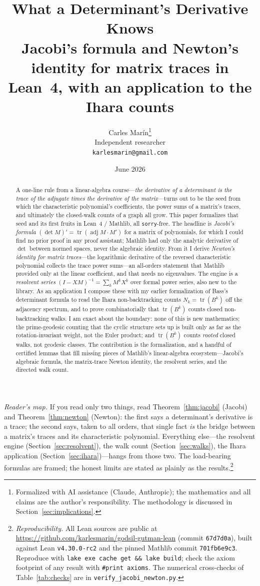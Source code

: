 \documentclass[11pt]{article}
\title{\bf What a Determinant's Derivative Knows\\[4pt]
  \large\normalfont Jacobi's formula and Newton's identity for matrix traces in Lean~4,
  with an application to the Ihara counts}
\author{Carles Mar\'in\thanks{Formalized with AI assistance (Claude, Anthropic); the mathematics
and all claims are the author's responsibility. The methodology is discussed in
Section~\ref{sec:implications}.}\\[3pt]
  \normalsize Independent researcher\\
  \normalsize \texttt{karlesmarin@gmail.com}}
\date{June 2026}
\newcommand{\lean}[1]{{\def\_{\textunderscore\allowbreak}\texttt{#1}}}
\newcommand{\tr}{\operatorname{tr}}
\newcommand{\adj}{\operatorname{adj}}
\begin{document}
\maketitle

\begin{abstract}
A one-line rule from a linear-algebra course---\emph{the derivative of a determinant is the trace of
the adjugate times the derivative of the matrix}---turns out to be the seed from which the
characteristic polynomial's coefficients, the power sums of a matrix's traces, and ultimately the
closed-walk counts of a graph all grow. This paper formalizes that seed and its first fruits in
Lean~4 / Mathlib, all \lean{sorry}-free. The headline is \emph{Jacobi's formula}
$(\det M)'=\tr(\adj M\cdot M')$ for a matrix of polynomials, for which I could find no prior proof in
any proof assistant; Mathlib had only the analytic derivative of $\det$ between normed spaces, never
the algebraic identity. From it I derive \emph{Newton's identity for matrix traces}---the logarithmic
derivative of the reversed characteristic polynomial collects the trace power sums---an all-orders
statement that Mathlib provided only at the linear coefficient, and that needs no eigenvalues. The
engine is a \emph{resolvent series} $(I-XM)^{-1}=\sum_k M^kX^k$ over formal power series, also new to
the library. As an application I compose these with my earlier formalization of Bass's determinant
formula to read the Ihara non-backtracking counts $N_k=\tr(B^k)$ off the adjacency spectrum, and to
prove combinatorially that $\tr(B^k)$ counts closed non-backtracking walks. I am exact about the
boundary: none of this is new mathematics; the prime-geodesic counting that the cyclic structure sets
up is built only as far as the rotation-invariant weight, not the Euler product; and $\tr(B^k)$
counts \emph{rooted} closed walks, not geodesic classes. The contribution is the formalization, and a
handful of certified lemmas that fill missing pieces of Mathlib's linear-algebra ecosystem---Jacobi's
algebraic formula, the matrix-trace Newton identity, the resolvent series, and the directed walk
count.
\end{abstract}

\noindent\emph{Reader's map.} If you read only two things, read Theorem~\ref{thm:jacobi} (Jacobi)
and Theorem~\ref{thm:newton} (Newton): the first says a determinant's derivative is a trace; the
second says, taken to all orders, that single fact \emph{is} the bridge between a matrix's traces and
its characteristic polynomial. Everything else---the resolvent engine
(Section~\ref{sec:resolvent}), the walk count (Section~\ref{sec:walks}), the Ihara application
(Section~\ref{sec:ihara})---hangs from those two. The load-bearing formulas are framed; the honest
limits are stated as plainly as the results.\footnote{\emph{Reproducibility.} All Lean sources are
public at \url{https://github.com/karlesmarin/godsil-gutman-lean} (commit \texttt{67d7d0a}), built
against Lean \texttt{v4.30.0-rc2} and the pinned Mathlib commit \texttt{701fb6e9c3}. Reproduce with
\texttt{lake exe cache get \&\& lake build}; check the axiom footprint of any result with
\lean{\#print axioms}. The numerical cross-checks of Table~\ref{tab:checks} are in
\texttt{verify\_jacobi\_newton.py}.}
\end{document}
